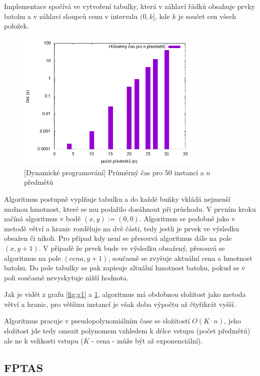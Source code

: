 \documentclass{article}
\begin{document}
Implementace spočívá ve vytvoření tabulky, která v záhlaví řádků obsahuje prvky batohu a v záhlaví sloupců cenu v intervalu $(0, k]$, kde $k$ je součet cen všech položek.

\begin{figure}[ht]
    \centering
    \includegraphics[width=0.8\textwidth]{dynamic-programming-duration.png}
    \caption{[Dynamické programování] Průměrný čas pro 50 instancí a $n$ předmětů}
    \label{fig:g2}
\end{figure}

Algoritmus postupně vyplňuje tabulku a do každé buňky vkládá nejmenší možnou hmotnost, které se mu podařilo dosáhnout při průchodu.
V prvním kroku začíná algoritmus v bodě $(x, y) := (0, 0)$.
Algoritmus se podobně jako v metodě větví a hranic rozděluje na dvě části, tedy jestli je prvek ve výsledku obsažen či nikoli.
Pro případ kdy není se přesouvá algoritmus dále na pole $(x, y+1)$.
V případě že prvek bude ve výsledku obsažený, přesouvá se algoritmus na pole $(cena, y+1)$, současně se zvyšuje aktuální cena a hmotnost batohu. Do pole tabulky se pak zapisuje altuální hmotnost batohu, pokud se v poli současně nevyskytuje nižší hodnota.

Jak je vidět z grafu \ref{fig:g1} a \ref{fig:g2}, algoritmus má obdobnou složitost jako metoda větví a hranic, pro většinu instancí je však doba výpočtu až čtyřikrát vyšší.

Algoritmus pracuje v pseudopolynomiálním čase se složitostí $O(K \cdot n)$, jeho složitost jde tedy omezit polynomem vzhledem k délce vstupu (počet předmětů) ale ne k velikosti vstupu ($K$ - cena - může být až exponenciální).

\subsection*{FPTAS}
\end{document}
